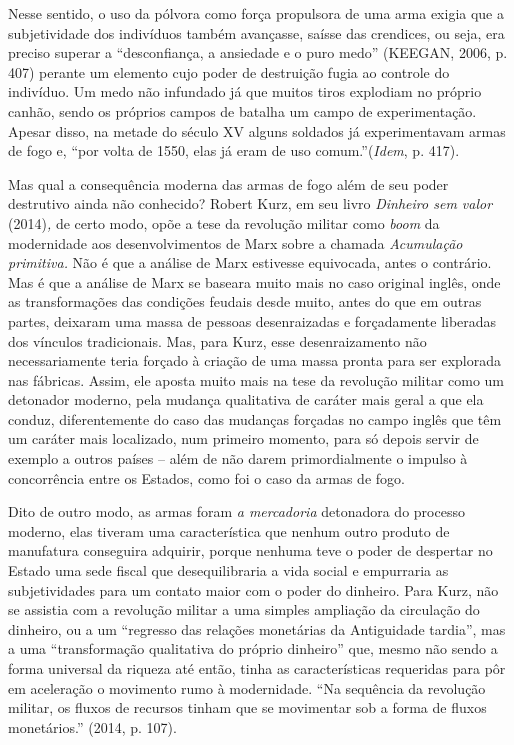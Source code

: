 Nesse sentido, o uso da pólvora como força propulsora de uma arma exigia
que a subjetividade dos indivíduos também avançasse, saísse das
crendices, ou seja, era preciso superar a ``desconfiança, a ansiedade e
o puro medo'' (KEEGAN, 2006, p. 407) perante um elemento cujo poder de
destruição fugia ao controle do indivíduo. Um medo não infundado já que
muitos tiros explodiam no próprio canhão, sendo os próprios campos de
batalha um campo de experimentação. Apesar disso, na metade do século XV
alguns soldados já experimentavam armas de fogo e, ``por volta de 1550,
elas já eram de uso comum.''(\emph{Idem}, p. 417).

Mas qual a consequência moderna das armas de fogo além de seu poder
destrutivo ainda não conhecido? Robert Kurz, em seu livro \emph{Dinheiro
sem valor} (2014)\emph{,} de certo modo, opõe a tese da revolução
militar como \emph{boom} da modernidade aos desenvolvimentos de Marx
sobre a chamada \emph{Acumulação primitiva.} Não é que a análise de Marx
estivesse equivocada, antes o contrário. Mas é que a análise de Marx se
baseara muito mais no caso original inglês, onde as transformações das
condições feudais desde muito, antes do que em outras partes, deixaram
uma massa de pessoas desenraizadas e forçadamente liberadas dos vínculos
tradicionais. Mas, para Kurz, esse desenraizamento não necessariamente
teria forçado à criação de uma massa pronta para ser explorada nas
fábricas. Assim, ele aposta muito mais na tese da revolução militar como
um detonador moderno, pela mudança qualitativa de caráter mais geral a
que ela conduz, diferentemente do caso das mudanças forçadas no campo
inglês que têm um caráter mais localizado, num primeiro momento, para só
depois servir de exemplo a outros países -- além de não darem
primordialmente o impulso à concorrência entre os Estados, como foi o
caso da armas de fogo.

Dito de outro modo, as armas foram \emph{a mercadoria} detonadora do
processo moderno, elas tiveram uma característica que nenhum outro
produto de manufatura conseguira adquirir, porque nenhuma teve o poder
de despertar no Estado uma sede fiscal que desequilibraria a vida social
e empurraria as subjetividades para um contato maior com o poder do
dinheiro. Para Kurz, não se assistia com a revolução militar a uma
simples ampliação da circulação do dinheiro, ou a um ``regresso das
relações monetárias da Antiguidade tardia'', mas a uma ``transformação
qualitativa do próprio dinheiro'' que, mesmo não sendo a forma universal
da riqueza até então, tinha as características requeridas para pôr em
aceleração o movimento rumo à modernidade. ``Na sequência da revolução
militar, os fluxos de recursos tinham que se movimentar sob a forma de
fluxos monetários.'' (2014, p. 107).

